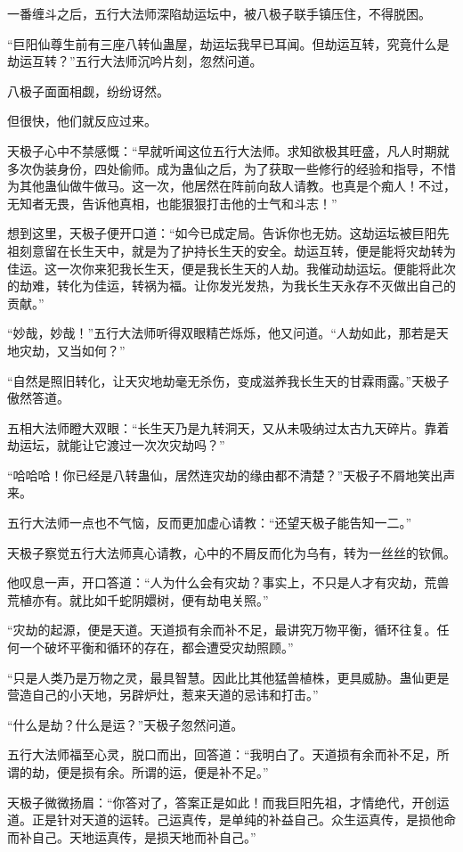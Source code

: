 \begin{this_body}
一番缠斗之后，五行大法师深陷劫运坛中，被八极子联手镇压住，不得脱困。

“巨阳仙尊生前有三座八转仙蛊屋，劫运坛我早已耳闻。但劫运互转，究竟什么是劫运互转？”五行大法师沉吟片刻，忽然问道。

八极子面面相觑，纷纷讶然。

但很快，他们就反应过来。

天极子心中不禁感慨：“早就听闻这位五行大法师。求知欲极其旺盛，凡人时期就多次伪装身份，四处偷师。成为蛊仙之后，为了获取一些修行的经验和指导，不惜为其他蛊仙做牛做马。这一次，他居然在阵前向敌人请教。也真是个痴人！不过，无知者无畏，告诉他真相，也能狠狠打击他的士气和斗志！”

想到这里，天极子便开口道：“如今已成定局。告诉你也无妨。这劫运坛被巨阳先祖刻意留在长生天中，就是为了护持长生天的安全。劫运互转，便是能将灾劫转为佳运。这一次你来犯我长生天，便是我长生天的人劫。我催动劫运坛。便能将此次的劫难，转化为佳运，转祸为福。让你发光发热，为我长生天永存不灭做出自己的贡献。”

“妙哉，妙哉！”五行大法师听得双眼精芒烁烁，他又问道。“人劫如此，那若是天地灾劫，又当如何？”

“自然是照旧转化，让天灾地劫毫无杀伤，变成滋养我长生天的甘霖雨露。”天极子傲然答道。

五相大法师瞪大双眼：“长生天乃是九转洞天，又从未吸纳过太古九天碎片。靠着劫运坛，就能让它渡过一次次灾劫吗？”

“哈哈哈！你已经是八转蛊仙，居然连灾劫的缘由都不清楚？”天极子不屑地笑出声来。

五行大法师一点也不气恼，反而更加虚心请教：“还望天极子能告知一二。”

天极子察觉五行大法师真心请教，心中的不屑反而化为乌有，转为一丝丝的钦佩。

他叹息一声，开口答道：“人为什么会有灾劫？事实上，不只是人才有灾劫，荒兽荒植亦有。就比如千蛇阴嬛树，便有劫电关照。”

“灾劫的起源，便是天道。天道损有余而补不足，最讲究万物平衡，循环往复。任何一个破坏平衡和循环的存在，都会遭受灾劫照顾。”

“只是人类乃是万物之灵，最具智慧。因此比其他猛兽植株，更具威胁。蛊仙更是营造自己的小天地，另辟炉灶，惹来天道的忌讳和打击。”

“什么是劫？什么是运？”天极子忽然问道。

五行大法师福至心灵，脱口而出，回答道：“我明白了。天道损有余而补不足，所谓的劫，便是损有余。所谓的运，便是补不足。”

天极子微微扬眉：“你答对了，答案正是如此！而我巨阳先祖，才情绝代，开创运道。正是针对天道的运转。己运真传，是单纯的补益自己。众生运真传，是损他命而补自己。天地运真传，是损天地而补自己。”


\end{this_body}
